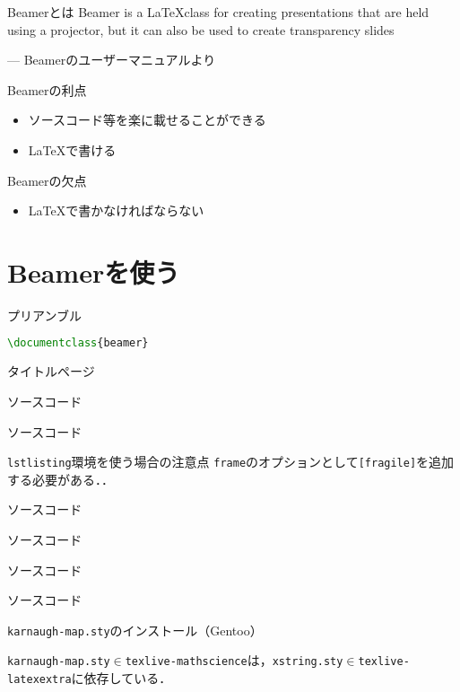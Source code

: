 \documentclass[dvipdfmx,uplatex,a4j,12pt]{beamer}
\newcommand\putsource[1]{
    \begin{frame}{ソースコード}

        
    \end{frame}
}
\newcommand\generateslides[1]{
    
    \putsource{#1.tex}
}
\begin{document}
\begin{frame}{Beamerとは}
    Beamer is a \LaTeX class for creating presentations that are held using a projector, but it can also be used to create transparency slides

    --- Beamerのユーザーマニュアルより\cite{beamer_manual}
\end{frame}

\begin{frame}{Beamerの利点}
    \begin{itemize}
        \item ソースコード等を楽に載せることができる
        \item \LaTeX で書ける
    \end{itemize}
\end{frame}

\begin{frame}{Beamerの欠点}
    \begin{itemize}
        \item \LaTeX で書かなければならない
    \end{itemize}
\end{frame}

\section{Beamerを使う}
\begin{frame}[fragile]{プリアンブル}
    \begin{lstlisting}[language={tex}]
\documentclass{beamer}
    \end{lstlisting}
\end{frame}

\begin{frame}[fragile]{タイトルページ}
    
\end{frame}

\generateslides{equation}
\generateslides{code}

\begin{frame}{\lstinline{lstlisting}環境を使う場合の注意点}
    \lstinline{frame}のオプションとして\lstinline{[fragile]}を追加する必要がある．\cite{why_fragile}．
\end{frame}

\generateslides{table}

\generateslides{itemize}
\generateslides{image}
\generateslides{karnaugh-map}

\begin{frame}[fragile]{\lstinline{karnaugh-map.sty}のインストール（Gentoo）}

    \lstinline{karnaugh-map.sty}$\in$\lstinline{texlive-mathscience}は，\lstinline{xstring.sty}$\in$\lstinline{texlive-latexextra}に依存している．

    \begin{lstlisting}[language={sh}, caption=\lstinline{e-file}]
    %sudo emerge -avt texlive-mathscience texlive-latexextra
    \end{lstlisting}
\end{frame}
\end{document}

